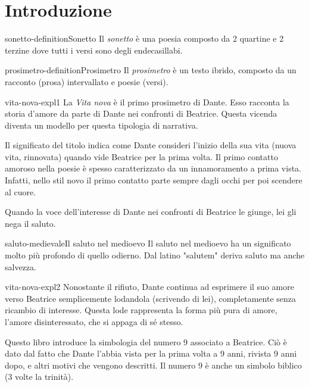 \documentclass[preview]{standalone}
\begin{document}
\genpage

\section{Introduzione}

\begin{snippetdefinition}{sonetto-definition}{Sonetto}
    Il \textit{sonetto} è una poesia composto da 2 quartine e 2 terzine dove tutti i versi sono degli endecasillabi.
\end{snippetdefinition}

\begin{snippetdefinition}{prosimetro-definition}{Prosimetro}
    Il \textit{prosimetro} è un testo ibrido, composto da un
    racconto (prosa) intervallato e poesie (versi).
\end{snippetdefinition}

\begin{snippet}{vita-nova-expl1}
    La \textit{Vita nova} è il primo prosimetro di Dante. Esso racconta la storia d'amore da parte di Dante
    nei confronti di Beatrice.
    Questa vicenda diventa un modello per questa tipologia di narrativa.
    
    Il significato del titolo indica come Dante consideri l'inizio della sua vita (nuova vita, rinnovata)
    quando vide Beatrice per la prima volta.
    Il primo contatto amoroso nella poesie è spesso caratterizzato da un innamoramento a prima vista.
    Infatti, nello stil novo il primo contatto parte sempre dagli occhi per poi scendere al cuore.
    
    Quando la voce dell'interesse di Dante nei confronti di Beatrice le giunge, lei gli nega il saluto.
\end{snippet}

\begin{snippetnote}{saluto-medievale}{Il saluto nel medioevo}
    Il saluto nel medioevo ha un significato molto più profondo di quello odierno.
    Dal latino "salutem" deriva saluto ma anche salvezza.
\end{snippetnote}

\begin{snippet}{vita-nova-expl2}
    Nonostante il rifiuto, Dante continua ad esprimere il suo amore verso Beatrice semplicemente
    lodandola (scrivendo di lei), completamente senza ricambio di interesse.
    Questa lode rappresenta la forma più pura di amore, l'amore disinteressato, che si appaga di sé stesso.
    
    Questo libro introduce la simbologia del numero 9 associato a Beatrice.
    Ciò è dato dal fatto che Dante l'abbia vista per la prima volta a 9 anni, rivista 9 anni dopo,
    e altri motivi che vengono descritti. Il numero 9 è anche un simbolo biblico (3 volte la trinità).
\end{snippet}
\end{document}
